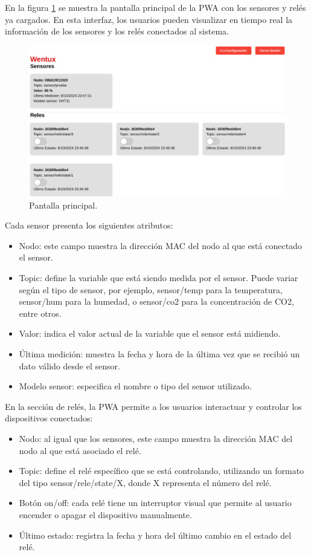 En la figura \ref{fig:home_comp} se muestra la pantalla principal de la PWA con los sensores y relés ya cargados. En esta interfaz, los usuarios pueden visualizar en tiempo real la información de los sensores y los relés conectados al sistema.


\begin{figure}[H]
\centering 
\includegraphics[width=1\textwidth]{./Figures/home_comp.png}
\caption{Pantalla principal.}
\label{fig:home_comp}
\end{figure}


Cada sensor presenta los siguientes atributos:

\begin{itemize}
	\item Nodo: este campo muestra la dirección MAC del nodo al que está conectado el sensor.
	\item Topic: define la variable que está siendo medida por el sensor. Puede variar según el tipo de sensor, por ejemplo, sensor/temp para la temperatura, sensor/hum para la humedad, o sensor/co2 para la concentración de CO2, entre otros.
	\item Valor: indica el valor actual de la variable que el sensor está midiendo.
	\item Última medición: muestra la fecha y hora de la última vez que se recibió un dato válido desde el sensor.
	\item Modelo sensor: especifica el nombre o tipo del sensor utilizado.
\end{itemize}

En la sección de relés, la PWA permite a los usuarios interactuar y controlar los dispositivos conectados:

\begin{itemize}
	\item Nodo: al igual que los sensores, este campo muestra la dirección MAC del nodo al que está asociado el relé.
	\item Topic: define el relé específico que se está controlando, utilizando un formato del tipo sensor/rele/state/X, donde X representa el número del relé.
	\item Botón on/off: cada relé tiene un interruptor visual que permite al usuario encender o apagar el dispositivo manualmente.
	\item Último estado: registra la fecha y hora del último cambio en el estado del relé.
\end{itemize}

